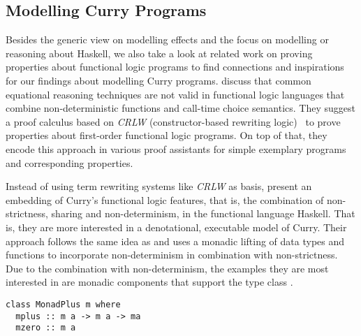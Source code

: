 \subsection{Modelling Curry Programs}

Besides the generic view on modelling effects and the focus on modelling or reasoning about Haskell, we also take a look at related work on proving properties about functional logic programs to find connections and inspirations for our findings about modelling Curry programs.
\citet{cleva2004logic} discuss that common equational reasoning techniques are not valid in functional logic languages that combine non\--deterministic functions and call\--time choice semantics.
They suggest a proof calculus based on \emph{CRLW} (constructor\--based rewriting logic)~\citep{gonzalez1996rewriting} to prove properties about first\--order functional logic programs.
On top of that, they encode this approach in various proof assistants for simple exemplary programs and corresponding properties.

Instead of using term rewriting systems like \emph{CRLW} as basis, \citet{fischer2009purely} present an embedding of Curry's functional logic features, that is, the combination of non\--strictness, sharing and non\--determinism, in the functional language Haskell.
That is, they are more interested in a denotational, executable model of Curry.
Their approach follows the same idea as \citet{abel2005verifying} and uses a monadic lifting of data types and functions to incorporate non\--determinism in combination with non\--strictness.
Due to the combination with non\--determinism, the examples they are most interested in are monadic components that support the type class .

\begin{verbatim}
class MonadPlus m where
  mplus :: m a -> m a -> ma
  mzero :: m a
\end{verbatim}

